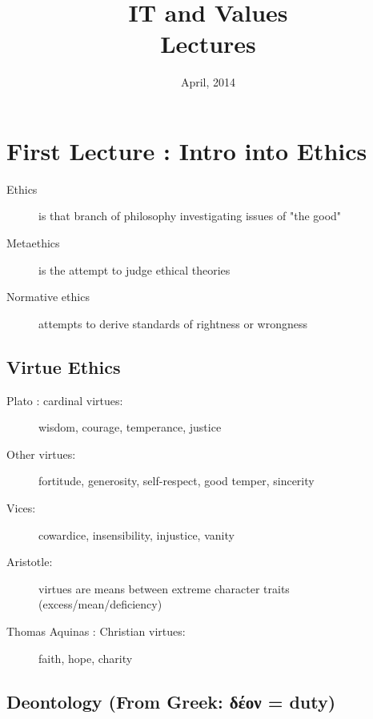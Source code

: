 \documentclass[a4paper]{article}
\begin{document}
\title{\textbf{IT and Values \\ Lectures}}
\author{}
\date{April, 2014}
\maketitle

\section{First Lecture : Intro into Ethics}

\begin{description}
\item[Ethics] is that branch of philosophy investigating issues of "the good"
\item[Metaethics] is the attempt to judge ethical theories
\item[Normative ethics] attempts to derive standards of rightness or wrongness
\end{description}

\subsection*{Virtue Ethics}

\begin{description}
\item[Plato : cardinal virtues:] wisdom, courage, temperance, justice
\item[Other virtues:] fortitude, generosity, self-respect, good temper, sincerity
\item[Vices:] cowardice, insensibility, injustice, vanity
\item[Aristotle:] virtues are means between extreme character traits (excess/mean/deficiency)
\item[Thomas Aquinas : Christian virtues:] faith, hope, charity
\end{description}

\subsection*{Deontology (From Greek: δέον = duty)}
\end{document}
